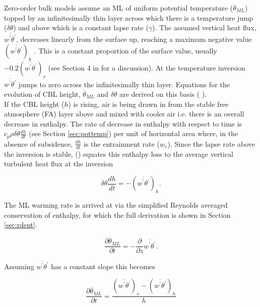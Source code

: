 Zero-order bulk models assume an \acs{ML} of uniform potential temperature ($\overline{\theta}_{ML}$) topped by an infinitesimally thin layer across which there is a temperature jump ($\delta \theta$) and above which is a constant lapse rate ($\gamma$).  The assumed vertical heat flux, $\overline{w^{'}\theta^{'}}$, decreases linearly from the surface up, reaching a maximum negative value $(\overline{w^{'}\theta^{'}})_{h}$ .  This is a constant proportion of the surface value, usually $-0.2(\overline{w^{'}\theta^{'}})_{s}$ (see Section 4 in \citeauthor{Tennekes73} \citeyear{Tennekes73} for a discussion). At the temperature inversion $\overline{w^{'}\theta^{'}}$ jumps to zero across the infinitesimally thin layer.  Equations for the evolution of \acs{CBL} height, $\overline{\theta}_{ML}$ and $\delta \theta$ are derived on this basis (\citeauthor{Tennekes73} \citeyear{Tennekes73}).\\

If the \acs{CBL} height ($h$) is rising, air is being drawn in from the stable free atmosphere (FA) layer above and mixed with cooler air i.e. there is an overall decrease in enthalpy.  The rate of decrease in enthalpy with respect to time is $c_{p}\rho \delta \theta \frac{dh}{dt}$ (see Section \ref{sec:pottemp}) per unit of horizontal area where, in the absence of subsidence, $\frac{dh}{dt}$ is the entrainment rate ($w_{e}$).  Since the lapse rate above the inversion is stable, \citeauthor{Tennekes73} (\citeyear{Tennekes73}) equates this enthalpy loss to the average vertical turbulent heat flux at the inversion

\begin{equation}
\delta \theta \frac{dh}{dt} = -(\overline{w^{'}\theta^{'}})_{h}. 
\end{equation}  

The \acs{ML} warming rate is arrived at via the simplified Reynolds averaged conservation of enthalpy, for which the full derivation is shown in Section \ref{sec:rdent}.

\begin{equation}
\label{eq:warming}
\frac{\partial \overline{\theta}_{ML}}{\partial t} = -\frac{\partial}{\partial z}\overline{w^{'}\theta^{'}}.
\end{equation}

Assuming $\overline{w^{'}\theta^{'}}$ has a constant slope this becomes

\begin{equation}
\frac{\partial \overline{\theta}_{ML}}{\partial t} = \frac{(\overline{w^{'}\theta^{'}})_{s}-(\overline{w^{'}\theta^{'}})_{h}}{h}
\end{equation}

